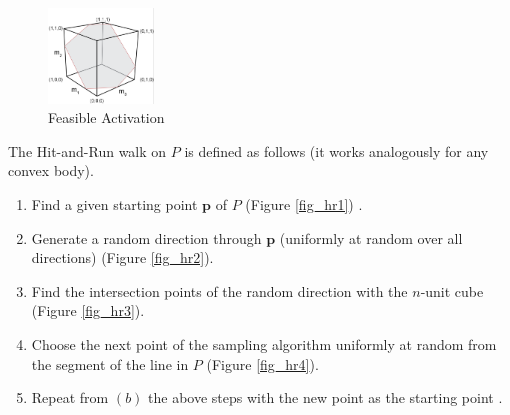 \begin{figure}[ht]
   \begin{center}
    \includegraphics[width=0.25\textwidth]{feasibleactivation.png}
  \end{center}
  \caption{Feasible Activation}
  \label{fig_hr}
\end{figure}

The Hit-and-Run walk on $P$ is defined as follows (it works analogously for any convex body). 
\begin{enumerate}
\item Find a given starting point $\textbf{p}$ of $P$ (Figure \ref{fig_hr1}) .
\item Generate a random direction through $\textbf{p}$ (uniformly at random over all directions) (Figure \ref{fig_hr2}).
\item Find the intersection points of the random direction with the $n$-unit cube (Figure \ref{fig_hr3}).
\item Choose the next point of the sampling algorithm uniformly at random from the segment of the line in $P$ (Figure \ref{fig_hr4}). 
\item Repeat from $(b)$ the above steps with the new point as the starting point .
\end{enumerate}


